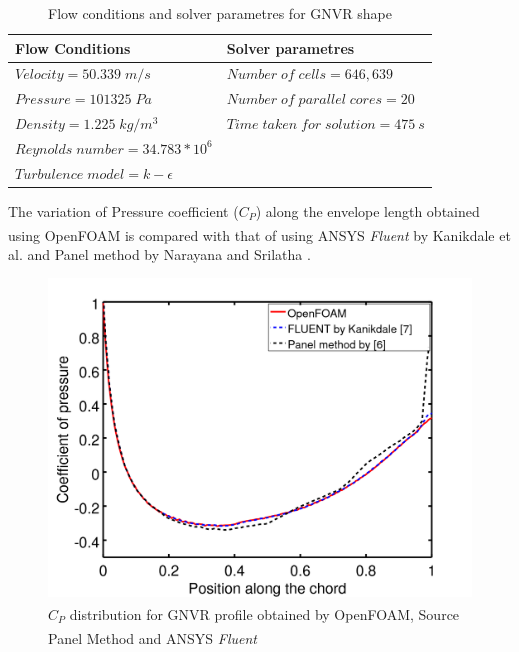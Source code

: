 \begin{table}[H]
	\caption{Flow conditions and solver parametres for GNVR shape}
	\label{Flow conditions and solver parametres for GNVR shape}
	\centering
	\begin{tabular}{ll}
		\hline \hline
		Flow Conditions & Solver parametres  \\ \hline \hline
		
		$ Velocity = 50.339 \; m/s$ & $Number \; of \; cells = 646,639$    \\  
		$ Pressure = 101325 \; Pa $ & $ Number \; of \; parallel \; cores = 20 $     \\
		$ Density = 1.225 \; kg/m^{3} $ & $ Time \; taken \; for \; solution = 475~s  $    \\
		$ Reynolds \; number = 34.783 * 10^{6} $ &    \\
		$ Turbulence \; model = k - \epsilon $ &     \\
		\hline
	\end{tabular}
\end{table}





The variation of Pressure coefficient ($C_{P}$) along the envelope length obtained using OpenFOAM\textsuperscript{\textregistered} is compared with that of using ANSYS\textsuperscript{\textregistered} \textit{Fluent} by Kanikdale et al. \cite{Kanikdale} and Panel method by Narayana and Srilatha \cite{srilata}. 

\begin{figure}[H]
	\centering
	\includegraphics[width=270 pt]{rnd/GNVR_cp.png}
	\caption{$C_{P}$ distribution for GNVR profile obtained by OpenFOAM\textsuperscript{\textregistered}, Source Panel Method \cite{srilata} and ANSYS\textsuperscript{\textregistered} \textit{Fluent} \cite{Kanikdale}}
	\label{fig:GNVR pressure distribution} %
\end{figure}

